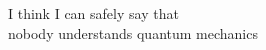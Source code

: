 \documentclass[preview]{standalone}
\begin{document}
\begin{center}
I think I can safely say that \\ nobody understands quantum mechanics
\end{center}
\end{document}
